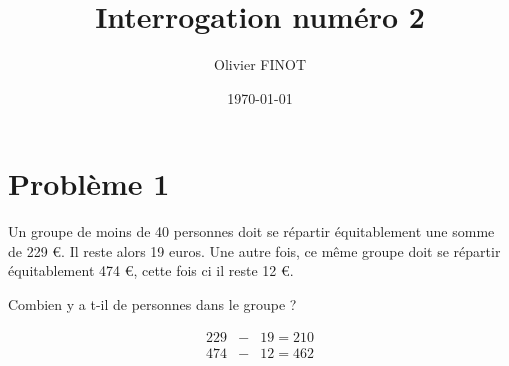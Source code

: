 \documentclass[a4paper,11pt]{exam}
\author{Olivier FINOT}
\date{\today}
\title{Interrogation num\'ero 2}
\begin{document}
	
	\maketitle
\section{Problème 1}
	Un groupe de moins de 40 personnes doit se répartir équitablement une somme de 229 €. Il reste alors 19 euros. Une autre fois, ce même groupe doit se répartir équitablement 474  €, cette fois ci il reste 12 €.
	\begin{questions} %
		
		\question Combien y a t-il de personnes dans le groupe ?
		\begin{solution}
			\begin{eqnarray}
				\num{229} & - & \num{19} = \num{210} \\
				\num{474} & - & \num{12} = \num{462} \\
			\end{eqnarray}
		\end{solution}
	\end{questions}
\end{document}
